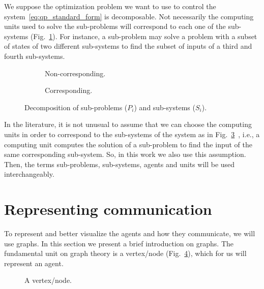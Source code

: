 \documentclass[../main.tex]{subfiles}
\begin{document}
We suppose the optimization problem we want to use to control the system~\eqref{eq:qp_standard_form} is decomposable.
Not necessarily the computing units used to solve the sub-problems will correspond to each one of the sub-systems (Fig.~\ref{fig:noncorresponding_division_system_problem}).
For instance, a sub-problem may solve a problem with a subset of states of two different sub-systems to find the subset of inputs of a third and fourth sub-systems.

\begin{figure}[h] \centering
  \begin{subfigure}{.4\textwidth}
    \centering
    \def\svgwidth{.8\textwidth}
    
    \caption{Non-corresponding.}\label{fig:noncorresponding_division_system_problem}
  \end{subfigure} \hfill
  \begin{subfigure}{.4\textwidth} \centering
    \def\svgwidth{.8\textwidth}
    
    \caption{Corresponding.}\label{fig:corresponding_division_system_problem}
  \end{subfigure}
  \caption{Decomposition of sub-problems ($P_i$) and
    sub-systems ($S_{i}$).}
\end{figure}

In the literature, it is not unusual to assume that we can choose the computing units in order to correspond to the sub-systems of the system as in Fig.~\ref{fig:corresponding_division_system_problem}~\cite{ArauzEtAl2021}, i.e., a computing unit computes the solution of a sub-problem to find the input of the same corresponding sub-system.
So, in this work we also use this assumption.
Then, the terms sub-problems, sub-systems, agents and units will be used interchangeably.

\section{Representing communication}

To represent and better visualize the agents and how they communicate, we will use graphs. In this section we present a brief introduction on graphs.
The fundamental unit on graph theory is a vertex/node (Fig.~\ref{fig:node}), which for us will represent an agent.
\begin{figure}[h]
  \centering
  \scalebox{1.25}
  {
  }
  \caption{A vertex/node.}\label{fig:node}
\end{figure}
\end{document}
